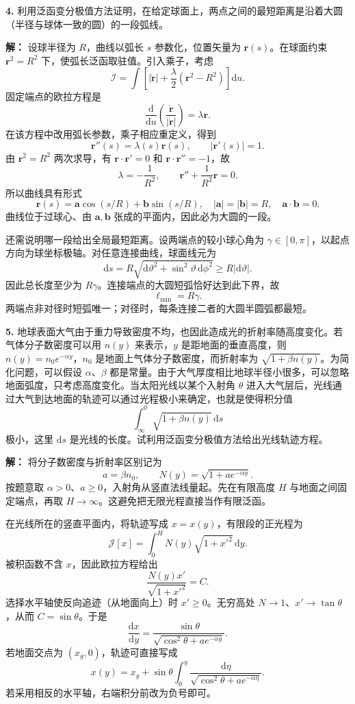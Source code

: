 \documentclass[11pt,a4paper]{ctexart}
\begin{document}
\noindent\textbf{4.} 利用泛函变分极值方法证明，在给定球面上，两点之间的最短距离是沿着大圆（半径与球体一致的圆）的一段弧线。

\textbf{解：} 设球半径为 $R$，曲线以弧长 $s$ 参数化，位置矢量为 $\bm r(s)$。在球面约束 $\bm r^2=R^2$ 下，使弧长泛函取驻值。引入乘子，考虑
\[
\mathcal I=\int\left[|\dot{\bm r}|+\frac{\lambda}2(\bm r^2-R^2)\right]\mathrm du.
\]
固定端点的欧拉方程是
\[
\frac{\mathrm d}{\mathrm du}\left(\frac{\dot{\bm r}}{|\dot{\bm r}|}\right)=\lambda\bm r.
\]
在该方程中改用弧长参数，乘子相应重定义，得到
\[
\bm r''(s)=\lambda(s)\bm r(s),\qquad |\bm r'(s)|=1.
\]
由 $\bm r^2=R^2$ 两次求导，有 $\bm r\cdot\bm r'=0$ 和 $\bm r\cdot\bm r''=-1$，故
\[
\lambda=-\frac1{R^2},\qquad \bm r''+\frac1{R^2}\bm r=0.
\]
所以曲线具有形式
\[
\bm r(s)=\bm a\cos(s/R)+\bm b\sin(s/R),
\quad |\bm a|=|\bm b|=R,\quad \bm a\cdot\bm b=0.
\]
曲线位于过球心、由 $\bm a,\bm b$ 张成的平面内，因此必为大圆的一段。

还需说明哪一段给出全局最短距离。设两端点的较小球心角为 $\gamma\in[0,\pi]$，以起点方向为球坐标极轴。对任意连接曲线，球面线元为
\[
\mathrm ds=R\sqrt{\mathrm d\vartheta^2+\sin^2\vartheta\,\mathrm d\phi^2}
\ge R|\mathrm d\vartheta|.
\]
因此总长度至少为 $R\gamma$。连接端点的大圆短弧恰好达到此下界，故
\[
{\ell_{\min}=R\gamma}.
\]
两端点非对径时短弧唯一；对径时，每条连接二者的大圆半圆弧都最短。

\noindent\textbf{5.} 地球表面大气由于重力导致密度不均，也因此造成光的折射率随高度变化。若气体分子数密度可以用 $n(y)$ 来表示，$y$ 是距地面的垂直高度，则 $n(y)=n_0e^{-\alpha y}$，$n_0$ 是地面上气体分子数密度，而折射率为 $\sqrt{1+\beta n(y)}$。为简化问题，可以假设 $\alpha$、$\beta$ 都是常量。由于大气厚度相比地球半径小很多，可以忽略地面弧度，只考虑高度变化。当太阳光线以某个入射角 $\theta$ 进入大气层后，光线通过大气到达地面的轨迹可以通过光程极小来确定，也就是使得积分值
\[
\int_{\infty}^{0}\sqrt{1+\beta n(y)}\,\mathrm ds
\]
极小，这里 $\mathrm ds$ 是光线的长度。试利用泛函变分极值方法给出光线轨迹方程。

\textbf{解：} 将分子数密度与折射率区别记为
\[
a=\beta n_0,\qquad N(y)=\sqrt{1+ae^{-\alpha y}}.
\]
按题意取 $\alpha>0$、$a\ge0$，入射角从竖直法线量起。先在有限高度 $H$ 与地面之间固定端点，再取 $H\to\infty$。这避免把无限光程直接当作有限泛函。

在光线所在的竖直平面内，将轨迹写成 $x=x(y)$，有限段的正光程为
\[
\mathcal J[x]=\int_0^H N(y)\sqrt{1+x'^2}\,\mathrm dy.
\]
被积函数不含 $x$，因此欧拉方程给出
\[
\frac{N(y)x'}{\sqrt{1+x'^2}}=C.
\]
选择水平轴使反向追迹（从地面向上）时 $x'\ge0$。无穷高处 $N\to1$、$x'\to\tan\theta$，从而 $C=\sin\theta$。于是
\[
{\frac{\mathrm dx}{\mathrm dy}=\frac{\sin\theta}{\sqrt{\cos^2\theta+ae^{-\alpha y}}}}.
\]
若地面交点为 $(x_g,0)$，轨迹可直接写成
\[
{x(y)=x_g+\sin\theta\int_0^y\frac{\mathrm d\eta}{\sqrt{\cos^2\theta+ae^{-\alpha\eta}}}}.
\]
若采用相反的水平轴，右端积分前改为负号即可。
\end{document}
